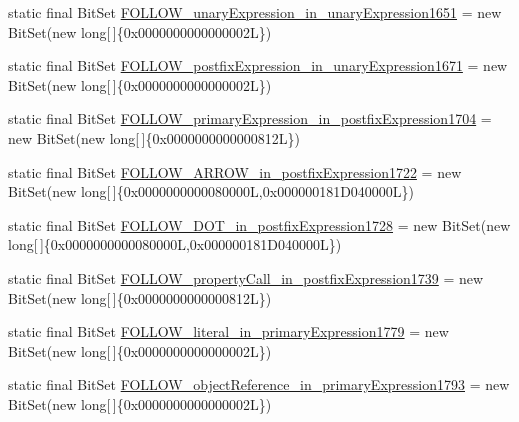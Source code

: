 \begin{DoxyCompactItemize}
\item 
static final Bit\-Set \hyperlink{classorg_1_1tzi_1_1use_1_1parser_1_1testsuite_1_1_test_suite_parser_a36c6175c4c9b97c920b6794f5fb4d468}{F\-O\-L\-L\-O\-W\-\_\-unary\-Expression\-\_\-in\-\_\-unary\-Expression1651} = new Bit\-Set(new long\mbox{[}$\,$\mbox{]}\{0x0000000000000002\-L\})
\item 
static final Bit\-Set \hyperlink{classorg_1_1tzi_1_1use_1_1parser_1_1testsuite_1_1_test_suite_parser_a3b5cb91b5e47974b6ad3c8fda661f9c9}{F\-O\-L\-L\-O\-W\-\_\-postfix\-Expression\-\_\-in\-\_\-unary\-Expression1671} = new Bit\-Set(new long\mbox{[}$\,$\mbox{]}\{0x0000000000000002\-L\})
\item 
static final Bit\-Set \hyperlink{classorg_1_1tzi_1_1use_1_1parser_1_1testsuite_1_1_test_suite_parser_afe8bc00f68d28da9af0f13e8d0964863}{F\-O\-L\-L\-O\-W\-\_\-primary\-Expression\-\_\-in\-\_\-postfix\-Expression1704} = new Bit\-Set(new long\mbox{[}$\,$\mbox{]}\{0x0000000000000812\-L\})
\item 
static final Bit\-Set \hyperlink{classorg_1_1tzi_1_1use_1_1parser_1_1testsuite_1_1_test_suite_parser_ab2c7d14ff17896badd8babaa0af0c019}{F\-O\-L\-L\-O\-W\-\_\-\-A\-R\-R\-O\-W\-\_\-in\-\_\-postfix\-Expression1722} = new Bit\-Set(new long\mbox{[}$\,$\mbox{]}\{0x0000000000080000\-L,0x000000181\-D040000\-L\})
\item 
static final Bit\-Set \hyperlink{classorg_1_1tzi_1_1use_1_1parser_1_1testsuite_1_1_test_suite_parser_aaaccf9b5ca4d81f80a18bc909bf99902}{F\-O\-L\-L\-O\-W\-\_\-\-D\-O\-T\-\_\-in\-\_\-postfix\-Expression1728} = new Bit\-Set(new long\mbox{[}$\,$\mbox{]}\{0x0000000000080000\-L,0x000000181\-D040000\-L\})
\item 
static final Bit\-Set \hyperlink{classorg_1_1tzi_1_1use_1_1parser_1_1testsuite_1_1_test_suite_parser_a2241555b909185415920f9ac08cc25da}{F\-O\-L\-L\-O\-W\-\_\-property\-Call\-\_\-in\-\_\-postfix\-Expression1739} = new Bit\-Set(new long\mbox{[}$\,$\mbox{]}\{0x0000000000000812\-L\})
\item 
static final Bit\-Set \hyperlink{classorg_1_1tzi_1_1use_1_1parser_1_1testsuite_1_1_test_suite_parser_af935694a3686cbee803526c8f61892a5}{F\-O\-L\-L\-O\-W\-\_\-literal\-\_\-in\-\_\-primary\-Expression1779} = new Bit\-Set(new long\mbox{[}$\,$\mbox{]}\{0x0000000000000002\-L\})
\item 
static final Bit\-Set \hyperlink{classorg_1_1tzi_1_1use_1_1parser_1_1testsuite_1_1_test_suite_parser_ade18719fa55be06dea9d91176248dd74}{F\-O\-L\-L\-O\-W\-\_\-object\-Reference\-\_\-in\-\_\-primary\-Expression1793} = new Bit\-Set(new long\mbox{[}$\,$\mbox{]}\{0x0000000000000002\-L\})

\end{DoxyCompactItemize}
